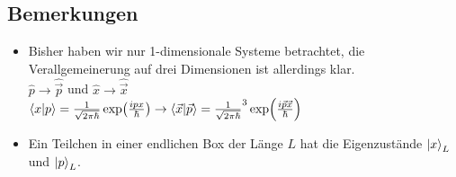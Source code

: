 \documentclass{report}
\begin{document}
 \subsection{Bemerkungen}
 \begin{itemize}
 	\item Bisher haben wir nur 1-dimensionale Systeme betrachtet, die Verallgemeinerung auf drei Dimensionen ist allerdings klar. \\
		$\hat{p} \to \hat{\vec{p}} $ und $\hat{x} \to \hat{\vec{x}}$ \\
		$\bra{x} \ket{p} = \frac{1}{\sqrt{2 \pi \hbar} } \exp(\frac{ipx}{\hbar}) \to \bra{\vec{x}} \ket{\vec{p}} = \frac{1}{\sqrt{2 \pi \hbar} }^3 \exp(\frac{i\vec{p}\vec{x}}{\hbar}) $ 
	\item Ein Teilchen in einer endlichen Box der Länge $L$ hat die Eigenzustände $\ket{x}_L $ und $\ket{p}_L$.
 \end{itemize}
\end{document}
